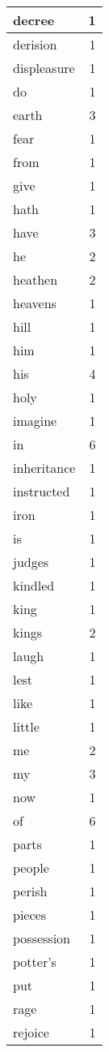 \begin{center}
\begin{longtable}{l|r}
decree & 1 \\ \hline
derision & 1 \\ \hline
displeasure & 1 \\ \hline
do & 1 \\ \hline
earth & 3 \\ \hline
fear & 1 \\ \hline
from & 1 \\ \hline
give & 1 \\ \hline
hath & 1 \\ \hline
have & 3 \\ \hline
he & 2 \\ \hline
heathen & 2 \\ \hline
heavens & 1 \\ \hline
hill & 1 \\ \hline
him & 1 \\ \hline
his & 4 \\ \hline
holy & 1 \\ \hline
imagine & 1 \\ \hline
in & 6 \\ \hline
inheritance & 1 \\ \hline
instructed & 1 \\ \hline
iron & 1 \\ \hline
is & 1 \\ \hline
judges & 1 \\ \hline
kindled & 1 \\ \hline
king & 1 \\ \hline
kings & 2 \\ \hline
laugh & 1 \\ \hline
lest & 1 \\ \hline
like & 1 \\ \hline
little & 1 \\ \hline
me & 2 \\ \hline
my & 3 \\ \hline
now & 1 \\ \hline
of & 6 \\ \hline
parts & 1 \\ \hline
people & 1 \\ \hline
perish & 1 \\ \hline
pieces & 1 \\ \hline
possession & 1 \\ \hline
potter's & 1 \\ \hline
put & 1 \\ \hline
rage & 1 \\ \hline
rejoice & 1 \\ \hline

\end{longtable}
\end{center}

